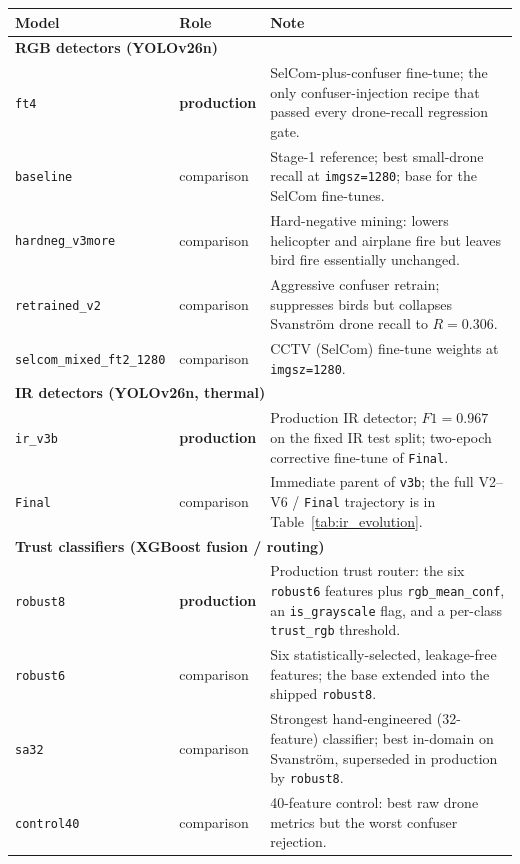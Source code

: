 \footnotesize
\begin{longtable}{p{}lp{}}
\toprule
Model & Role & Note \\
\midrule
\endhead
\multicolumn{3}{l}{\textbf{RGB detectors (YOLOv26n)}} \\
\midrule
\texttt{ft4} & \textbf{production} & SelCom-plus-confuser fine-tune; the only confuser-injection recipe that passed every drone-recall regression gate. \\
\texttt{baseline} & comparison & Stage-1 reference; best small-drone recall at \texttt{imgsz=1280}; base for the SelCom fine-tunes. \\
\texttt{hardneg\_v3more} & comparison & Hard-negative mining: lowers helicopter and airplane fire but leaves bird fire essentially unchanged. \\
\texttt{retrained\_v2} & comparison & Aggressive confuser retrain; suppresses birds but collapses Svanstr\"om drone recall to $R=0.306$. \\
\texttt{selcom\_mixed\_ft2\_1280} & comparison & CCTV (SelCom) fine-tune weights at \texttt{imgsz=1280}. \\
\midrule
\multicolumn{3}{l}{\textbf{IR detectors (YOLOv26n, thermal)}} \\
\midrule
\texttt{ir\_v3b} & \textbf{production} & Production IR detector; $F1=0.967$ on the fixed IR test split; two-epoch corrective fine-tune of \texttt{Final}. \\
\texttt{Final} & comparison & Immediate parent of \texttt{v3b}; the full V2--V6 / \texttt{Final} trajectory is in Table~\ref{tab:ir_evolution}. \\
\midrule
\multicolumn{3}{l}{\textbf{Trust classifiers (XGBoost fusion / routing)}} \\
\midrule
\texttt{robust8} & \textbf{production} & Production trust router: the six \texttt{robust6} features plus \texttt{rgb\_mean\_conf}, an \texttt{is\_grayscale} flag, and a per-class \texttt{trust\_rgb} threshold. \\
\texttt{robust6} & comparison & Six statistically-selected, leakage-free features; the base extended into the shipped \texttt{robust8}. \\
\texttt{sa32} & comparison & Strongest hand-engineered (32-feature) classifier; best in-domain on Svanstr\"om, superseded in production by \texttt{robust8}. \\
\texttt{control40} & comparison & 40-feature control: best raw drone metrics but the worst confuser rejection. \\

\end{longtable}
